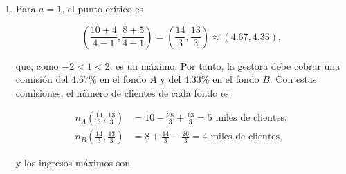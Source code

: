 \documentclass[
  spanish,
  a4paper,
]{scrreport}
\providecommand{\tightlist}{%
  \setlength{\itemsep}{0pt}\setlength{\parskip}{0pt}}
\theoremstyle{definition}
\theoremstyle{remark}
\begin{document}
\begin{tcolorbox}
\begin{enumerate}
  Aplicando el
  \href{https://aprendeconalf.es/analisis-manual/13-derivadas-funciones-varias-variables.html\#thm-extremos-funcion-dos-variables}{criterio
  del hessiano} se tiene:

  \begin{itemize}
  \tightlist
  \item
    Si \(-2 < a < 2\), entonces \(|\nabla^2 I| > 0\) y como
    \(\frac{\partial^2 I}{\partial x^2} = -4 < 0\), el punto crítico es
    un \emph{máximo relativo}. Además, como la función es un polinomio
    de segundo grado con hessiana definida negativa, es el máximo
    absoluto.
  \item
    Si \(a < -2\) o \(a > 2\), entonces \(|\nabla^2 I| < 0\) y el punto
    crítico es un \emph{punto de silla}.
  \item
    Si \(a = \pm 2\) no hay puntos críticos.
  \end{itemize}

  Así pues, solo existen unas comisiones que maximizan los ingresos
  cuando \(-2<a<2\), es decir, cuando el efecto de la comisión de un
  fondo sobre los clientes del otro es menor que el efecto sobre sus
  propios clientes. Si \(|a|>2\), al subir a la vez las comisiones de
  ambos fondos (si \(a>2\)) o al subir una y bajar la otra (si \(a<-2\))
  los ingresos crecerían indefinidamente, lo que no es realista y
  muestra que el modelo solo tiene sentido económico para \(|a|<2\).
  Además, para que las comisiones óptimas sean positivas debe cumplirse
  \(8+5a>0\), es decir, \(a>-1.6\).
\item
  Para \(a=1\), el punto crítico es

  \[
  \left(\frac{10+4}{4-1}, \frac{8+5}{4-1}\right) = \left(\frac{14}{3}, \frac{13}{3}\right) \approx (4.67, 4.33),
  \]

  que, como \(-2<1<2\), es un máximo. Por tanto, la gestora debe cobrar
  una comisión del \(4.67\%\) en el fondo \(A\) y del \(4.33\%\) en el
  fondo \(B\). Con estas comisiones, el número de clientes de cada fondo
  es

  \begin{align*}
  n_A\left(\frac{14}{3}, \frac{13}{3}\right) &= 10 - \frac{28}{3} + \frac{13}{3} = 5 \mbox{ miles de clientes},\\
  n_B\left(\frac{14}{3}, \frac{13}{3}\right) &= 8 + \frac{14}{3} - \frac{26}{3} = 4 \mbox{ miles de clientes},
  \end{align*}

  y los ingresos máximos son


\end{enumerate}
\end{tcolorbox}
\end{document}
